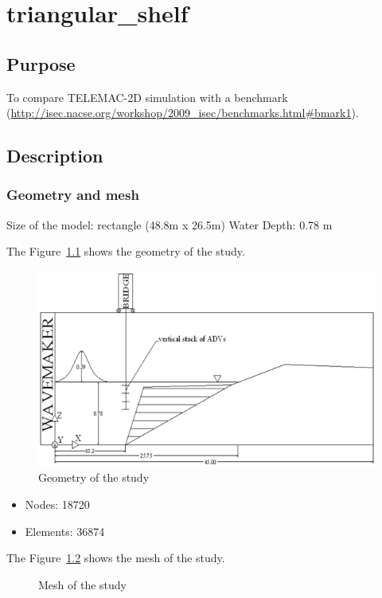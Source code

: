 \chapter{triangular\_shelf}

\section{Purpose}

To compare TELEMAC-2D simulation with a benchmark
(\url{http://isec.nacse.org/workshop/2009_isec/benchmarks.html#bmark1}).

\section{Description}

\subsection{Geometry and mesh}

Size of the model: rectangle (48.8m x 26.5m)
Water Depth: 0.78 m

The Figure~\ref{fig:triang:geometry} shows the geometry of the study.
\begin{figure}
\centering
\includegraphics[width=.6\textwidth]{img/geom.png}
\caption{Geometry of the study}\label{fig:triang:geometry}
\end{figure}

\begin{itemize}
  \item Nodes: 18720
  \item Elements: 36874
\end{itemize}

The Figure~\ref{fig:triang:mesh} shows the mesh of the study.
\begin{figure}
\centering
{}
\caption{Mesh of the study}\label{fig:triang:mesh}
\end{figure}


